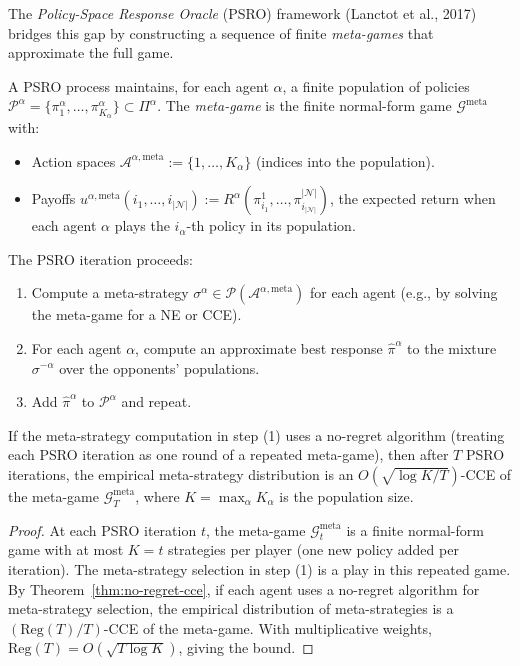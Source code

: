 The \emph{Policy-Space Response Oracle} (PSRO) framework (Lanctot et al., 2017) bridges this gap by constructing a sequence of finite \emph{meta-games} that approximate the full game.

\begin{definition}\label{def:psro}
A PSRO process maintains, for each agent $\alpha$, a finite population of policies $\mathcal{P}^\alpha = \{\pi^\alpha_1,\ldots,\pi^\alpha_{K_\alpha}\}\subset\Pi^\alpha$. The \emph{meta-game} is the finite normal-form game $\mathcal{G}^{\mathrm{meta}}$ with:
\begin{itemize}
    \item Action spaces $\mathcal{A}^{\alpha,\mathrm{meta}} := \{1,\ldots,K_\alpha\}$ (indices into the population).
    \item Payoffs $u^{\alpha,\mathrm{meta}}(i_1,\ldots,i_{|\mathcal{N}|}) := R^\alpha(\pi^1_{i_1},\ldots,\pi^{|\mathcal{N}|}_{i_{|\mathcal{N}|}})$, the expected return when each agent $\alpha$ plays the $i_\alpha$-th policy in its population.
\end{itemize}
\end{definition}

The PSRO iteration proceeds:
\begin{enumerate}
    \item Compute a meta-strategy $\sigma^\alpha\in\mathcal{P}(\mathcal{A}^{\alpha,\mathrm{meta}})$ for each agent (e.g., by solving the meta-game for a NE or CCE).
    \item For each agent $\alpha$, compute an approximate best response $\hat\pi^\alpha$ to the mixture $\sigma^{-\alpha}$ over the opponents' populations.
    \item Add $\hat\pi^\alpha$ to $\mathcal{P}^\alpha$ and repeat.
\end{enumerate}

\begin{proposition}\label{prop:psro-convergence}
If the meta-strategy computation in step (1) uses a no-regret algorithm (treating each PSRO iteration as one round of a repeated meta-game), then after $T$ PSRO iterations, the empirical meta-strategy distribution is an $O(\sqrt{\log K / T})$-CCE of the meta-game $\mathcal{G}^{\mathrm{meta}}_T$, where $K = \max_\alpha K_\alpha$ is the population size.
\end{proposition}

\begin{proof}
At each PSRO iteration $t$, the meta-game $\mathcal{G}^{\mathrm{meta}}_t$ is a finite normal-form game with at most $K = t$ strategies per player (one new policy added per iteration). The meta-strategy selection in step (1) is a play in this repeated game. By Theorem~\ref{thm:no-regret-cce}, if each agent uses a no-regret algorithm for meta-strategy selection, the empirical distribution of meta-strategies is a $(\mathrm{Reg}(T)/T)$-CCE of the meta-game. With multiplicative weights, $\mathrm{Reg}(T) = O(\sqrt{T\log K})$, giving the bound.
\end{proof}


